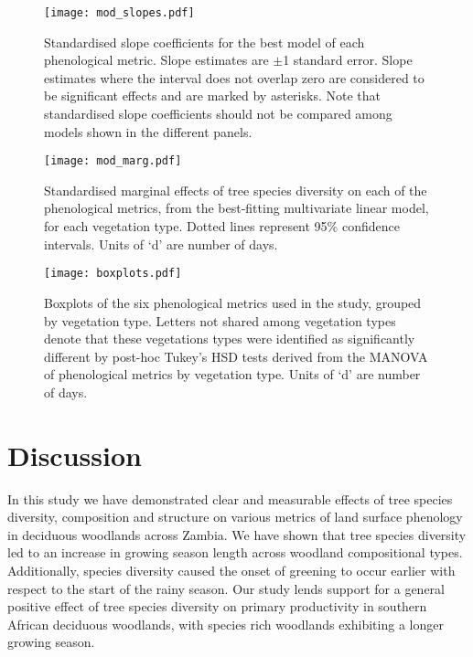 \documentclass[11pt,a4paper]{article}
\begin{document}
\begin{figure}[H]
\centering
	\texttt{[image: mod\_slopes.pdf]}
	\caption{Standardised slope coefficients for the best model of each phenological metric. Slope estimates are $\pm$1 standard error. Slope estimates where the interval does not overlap zero are considered to be significant effects and are marked by asterisks. Note that standardised slope coefficients should not be compared among models shown in the different panels.}
	\label{mod_slopes}
\end{figure}

\begin{figure}[H]
\centering
	\texttt{[image: mod\_marg.pdf]}
	\caption{Standardised marginal effects of tree species diversity on each of the phenological metrics, from the best-fitting multivariate linear model, for each vegetation type. Dotted lines represent 95\% confidence intervals. Units of `d' are number of days.}
	\label{mod_marg}
\end{figure}

\begin{figure}[H]
\centering
	\texttt{[image: boxplots.pdf]}
	\caption{Boxplots of the six phenological metrics used in the study, grouped by vegetation type. Letters not shared among vegetation types denote that these vegetations types were identified as significantly different by post-hoc Tukey's HSD tests derived from the MANOVA of phenological metrics by vegetation type. Units of `d' are number of days.}
	\label{boxplots}
\end{figure}

\section{Discussion}

In this study we have demonstrated clear and measurable effects of tree species diversity, composition and structure on various metrics of land surface phenology in deciduous woodlands across Zambia. We have shown that tree species diversity led to an increase in growing season length across woodland compositional types. Additionally, species diversity caused the onset of greening to occur earlier with respect to the start of the rainy season. Our study lends support for a general positive effect of tree species diversity on primary productivity in southern African deciduous woodlands, with species rich woodlands exhibiting a longer growing season.
\end{document}
